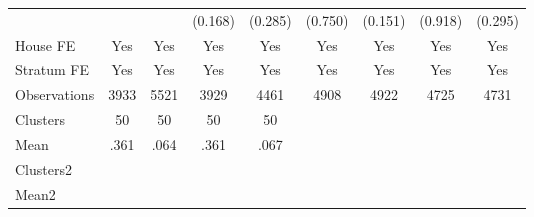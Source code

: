 {\begin{tabular}{l*{8}{c}}
                &                  &                  &  (0.168)         &  (0.285)         &  (0.750)         &  (0.151)         &  (0.918)         &  (0.295)         \\
House FE        &      Yes         &      Yes         &      Yes         &      Yes         &      Yes         &      Yes         &      Yes         &      Yes         \\
Stratum FE      &      Yes         &      Yes         &      Yes         &      Yes         &      Yes         &      Yes         &      Yes         &      Yes         \\
\midrule
Observations    &     3933         &     5521         &     3929         &     4461         &     4908         &     4922         &     4725         &     4731         \\
Clusters        &       50         &       50         &       50         &       50         &                  &                  &                  &                  \\
Mean            &     .361         &     .064         &     .361         &     .067         &                  &                  &                  &                  \\
Clusters2       &                  &                  &                  &                  &                  &                  &                  &                  \\
Mean2           &                  &                  &                  &                  &                  &                  &                  &                  \\
\bottomrule
\end{tabular}
}
